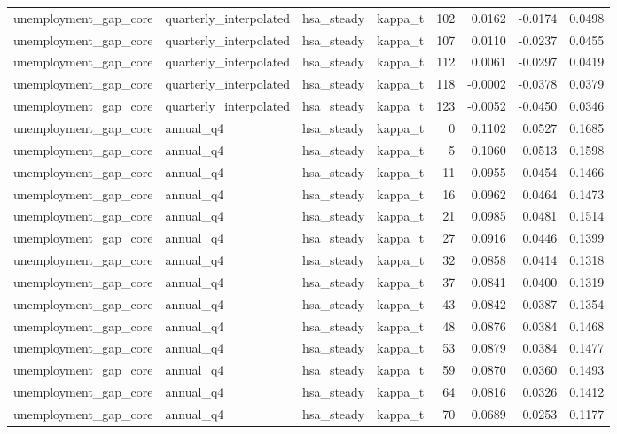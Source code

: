 \begin{tabular}{llllrrrr}
unemployment\_gap\_core & quarterly\_interpolated & hsa\_steady & kappa\_t & 102 & 0.0162 & -0.0174 & 0.0498 \\
unemployment\_gap\_core & quarterly\_interpolated & hsa\_steady & kappa\_t & 107 & 0.0110 & -0.0237 & 0.0455 \\
unemployment\_gap\_core & quarterly\_interpolated & hsa\_steady & kappa\_t & 112 & 0.0061 & -0.0297 & 0.0419 \\
unemployment\_gap\_core & quarterly\_interpolated & hsa\_steady & kappa\_t & 118 & -0.0002 & -0.0378 & 0.0379 \\
unemployment\_gap\_core & quarterly\_interpolated & hsa\_steady & kappa\_t & 123 & -0.0052 & -0.0450 & 0.0346 \\
unemployment\_gap\_core & annual\_q4 & hsa\_steady & kappa\_t & 0 & 0.1102 & 0.0527 & 0.1685 \\
unemployment\_gap\_core & annual\_q4 & hsa\_steady & kappa\_t & 5 & 0.1060 & 0.0513 & 0.1598 \\
unemployment\_gap\_core & annual\_q4 & hsa\_steady & kappa\_t & 11 & 0.0955 & 0.0454 & 0.1466 \\
unemployment\_gap\_core & annual\_q4 & hsa\_steady & kappa\_t & 16 & 0.0962 & 0.0464 & 0.1473 \\
unemployment\_gap\_core & annual\_q4 & hsa\_steady & kappa\_t & 21 & 0.0985 & 0.0481 & 0.1514 \\
unemployment\_gap\_core & annual\_q4 & hsa\_steady & kappa\_t & 27 & 0.0916 & 0.0446 & 0.1399 \\
unemployment\_gap\_core & annual\_q4 & hsa\_steady & kappa\_t & 32 & 0.0858 & 0.0414 & 0.1318 \\
unemployment\_gap\_core & annual\_q4 & hsa\_steady & kappa\_t & 37 & 0.0841 & 0.0400 & 0.1319 \\
unemployment\_gap\_core & annual\_q4 & hsa\_steady & kappa\_t & 43 & 0.0842 & 0.0387 & 0.1354 \\
unemployment\_gap\_core & annual\_q4 & hsa\_steady & kappa\_t & 48 & 0.0876 & 0.0384 & 0.1468 \\
unemployment\_gap\_core & annual\_q4 & hsa\_steady & kappa\_t & 53 & 0.0879 & 0.0384 & 0.1477 \\
unemployment\_gap\_core & annual\_q4 & hsa\_steady & kappa\_t & 59 & 0.0870 & 0.0360 & 0.1493 \\
unemployment\_gap\_core & annual\_q4 & hsa\_steady & kappa\_t & 64 & 0.0816 & 0.0326 & 0.1412 \\
unemployment\_gap\_core & annual\_q4 & hsa\_steady & kappa\_t & 70 & 0.0689 & 0.0253 & 0.1177 \\

\end{tabular}
